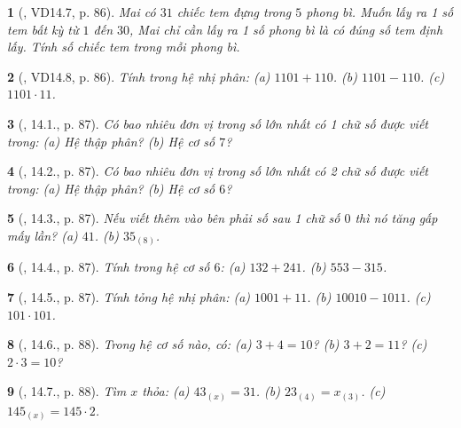 \documentclass{article}
\newtheorem{baitoan}{}
\begin{document}
\begin{baitoan}[\cite{TLCT_THCS_Toan_6_so_hoc}, VD14.7, p. 86]
	Mai có $31$ chiếc tem đựng trong $5$ phong bì. Muốn lấy ra 1 số tem bất kỳ từ $1$ đến $30$, Mai chỉ cần lấy ra 1 số phong bì là có đúng số tem định lấy. Tính số chiếc tem trong mỗi phong bì.
\end{baitoan}

\begin{baitoan}[\cite{TLCT_THCS_Toan_6_so_hoc}, VD14.8, p. 86]
	Tính trong hệ nhị phân: (a) $1101 + 110$. (b) $1101 - 110$. (c) $1101\cdot11$.
\end{baitoan}

\begin{baitoan}[\cite{TLCT_THCS_Toan_6_so_hoc}, 14.1., p. 87]
	Có bao nhiêu đơn vị trong số lớn nhất có 1 chữ số được viết trong: (a) Hệ thập phân? (b) Hệ cơ số $7$?
\end{baitoan}

\begin{baitoan}[\cite{TLCT_THCS_Toan_6_so_hoc}, 14.2., p. 87]
	Có bao nhiêu đơn vị trong số lớn nhất có 2 chữ số được viết trong: (a) Hệ thập phân? (b) Hệ cơ số $6$?
\end{baitoan}

\begin{baitoan}[\cite{TLCT_THCS_Toan_6_so_hoc}, 14.3., p. 87]
	Nếu viết thêm vào bên phải số sau 1 chữ số $0$ thì nó tăng gấp mấy lần? (a) $41$. (b) $35_{(8)}$.
\end{baitoan}

\begin{baitoan}[\cite{TLCT_THCS_Toan_6_so_hoc}, 14.4., p. 87]
	Tính trong hệ cơ số $6$: (a) $132 + 241$. (b) $553 - 315$.
\end{baitoan}

\begin{baitoan}[\cite{TLCT_THCS_Toan_6_so_hoc}, 14.5., p. 87]
	Tính tỏng hệ nhị phân: (a) $1001 + 11$. (b) $10010 - 1011$. (c) $101\cdot101$.
\end{baitoan}

\begin{baitoan}[\cite{TLCT_THCS_Toan_6_so_hoc}, 14.6., p. 88]
	Trong hệ cơ số nào, có: (a) $3 + 4 = 10$? (b) $3 + 2 = 11$? (c) $2\cdot3 = 10$?
\end{baitoan}

\begin{baitoan}[\cite{TLCT_THCS_Toan_6_so_hoc}, 14.7., p. 88]
	Tìm $x$ thỏa: (a) $43_{(x)} = 31$. (b) $23_(4) = x_{(3)}$. (c) $145_{(x)} = 145\cdot2$.
\end{baitoan}
\end{document}
